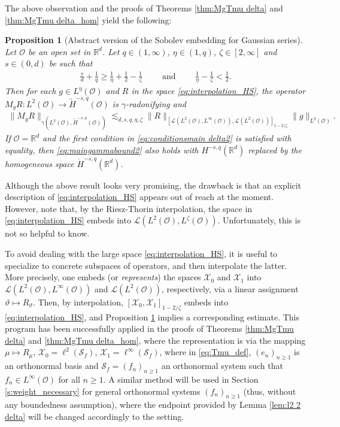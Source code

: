 \documentclass[reqno]{amsart}
\theoremstyle{plain}
\theoremstyle{remark}
\theoremstyle{plain}
\newtheorem{proposition}[theorem]{Proposition}
\numberwithin{equation}{section}
\newcommand\calL{\mathcal{L}}
\newcommand\cO{\mathcal{O}}
\def\R{{\mathbb R}}
\newcommand{\wt}{\widetilde}
\newcommand{\1}{\one}
\newcommand{\Sf}{\mathcal{S}_{f}}
\begin{document}
The above observation and the proofs of Theorems \ref{thm:MgTmu delta} and \ref{thm:MgTmu delta_hom} yield the following:

\begin{proposition}[Abstract version of the Sobolev embedding for Gaussian series]\label{prop:abstract}
Let $\cO$ be an open set in $\R^d$. Let $q\in (1, \infty)$, $\eta\in (1, q)$, $\zeta\in [2, \infty]$ and $s\in(0,d)$ be such that 
\begin{align}\label{eq:conditionsmain delta2}
\frac{s}{d} + \frac{1}{q}  \geq \frac{1}{\eta} + \frac{1}{2} - \frac{1}{\zeta}\qquad \text{ and }\qquad 
\frac{1}{\eta} - \frac{1}{\zeta}<\frac{1}{2}.
\end{align}
Then for each $g\in L^{\eta}(\mathcal{O})$ and $R$ in the space \eqref{eq:interpolation_HS}, the operator 
$M_g R:L^2(\mathcal{O})\to \wt{H}^{-s,q}(\mathcal{O})$
is $\gamma$-radonifying and 
\begin{align}\label{eq:maingammabound2}
\|M_g R\|_{\gamma(L^2(\mathcal{O}), \wt{H}^{-s,q}(\mathcal{O}))}\lesssim_{d,s,q,\eta,\zeta} \|R\|_{[\calL(L^2(\cO), L^\infty(\cO)), \calL(L^2(\cO))]_{1 - 2/\zeta}} \|g\|_{L^{\eta}(\mathcal{O})}.
\end{align} 
If $\cO=\R^d$ and the first condition in \eqref{eq:conditionsmain delta2} is satisfied with equality, then \eqref{eq:maingammabound2} also holds with $H^{-s,q}(\R^d)$ replaced by the homogeneous space $\dot{H}^{-s,q}(\R^d)$.
\end{proposition}


Although the above result looks very promising, the drawback is that an explicit description of \eqref{eq:interpolation_HS} appears out of reach at the moment. However, note that, by the Riesz-Thorin interpolation, the space in \eqref{eq:interpolation_HS} embeds into $\calL(L^2(\cO),L^{\zeta}(\cO))$. Unfortunately, this is not so helpful to know. 

\smallskip

To avoid dealing with the large space \eqref{eq:interpolation_HS}, it is useful to specialize to concrete subspaces of operators, and then interpolate the latter. More precisely, one embeds (or \emph{represents}) the spaces $\mathcal{X}_0$ and $\mathcal{X}_1$ into $ \calL(L^2(\cO), L^\infty(\cO))$ and $\calL(L^2(\cO))$, respectively, via a linear assignment  $\vartheta\mapsto R_\vartheta$. Then, by interpolation, $[\mathcal{X}_0,\mathcal{X}_1]_{1-2/\zeta}$ embeds into \eqref{eq:interpolation_HS}, and Proposition \ref{prop:abstract} implies a corresponding estimate. This program has been successfully applied in the proofs of Theorems \ref{thm:MgTmu delta} and \ref{thm:MgTmu delta_hom}, where the representation is via the mapping $\mu\mapsto R_\mu$, $\mathcal{X}_0=\ell^2(\Sf)$, $\mathcal{X}_1=\ell^\infty(\Sf)$, where in \eqref{eq:Tmu_def}, $(e_n)_{n\geq 1}$ is an orthonormal basis and $\Sf=(f_n)_{n\geq 1}$ an orthonormal system such that $f_n\in L^\infty(\cO)$ for all $n\geq 1$. A similar method will be used in Section \ref{s:weight_necessary} for general orthonormal systems $(f_n)_{n\geq 1}$ (thus, without any boundedness assumption), where the endpoint provided by Lemma \ref{lem:l2 2 delta} will be changed accordingly to the setting. 
\end{document}
